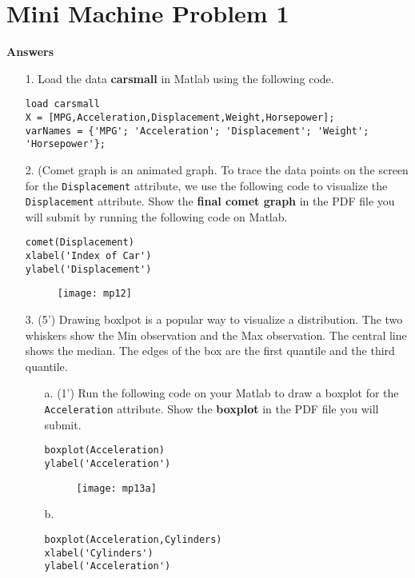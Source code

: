 \section*{Mini Machine Problem 1 }

\textbf{Answers} 


\begin{enumerate}
\item[1.] Load the data \textbf{carsmall} in Matlab using the following code.
\begin{lstlisting}
load carsmall
X = [MPG,Acceleration,Displacement,Weight,Horsepower];
varNames = {'MPG'; 'Acceleration'; 'Displacement'; 'Weight'; 'Horsepower'};
\end{lstlisting}
\item[2.] (Comet graph is an animated graph. To trace the data points on the screen for the \texttt{Displacement} attribute, we use the following code to visualize the \texttt{Displacement} attribute. Show the \textbf{final comet graph} in the PDF file you will submit by running the following code on Matlab.
\begin{lstlisting}
comet(Displacement)
xlabel('Index of Car')
ylabel('Displacement')
\end{lstlisting}

  \begin{figure}[h]
  \centering
\texttt{[image: mp12]}
  \end{figure}
  

\item[3.] (5') Drawing boxlpot is a popular way to visualize a distribution. The two whiskers show the Min observation and the Max observation. The central line shows the median. The edges of the box are the first quantile and the third quantile. 
\begin{itemize}
\item[a.] (1') Run the following code on your Matlab to draw a boxplot for the \texttt{Acceleration} attribute. Show the \textbf{boxplot}  in the PDF file you will submit.
\begin{lstlisting}
boxplot(Acceleration)
ylabel('Acceleration')
\end{lstlisting}
  \begin{figure}[h]
  \centering
\texttt{[image: mp13a]}
  \end{figure}
  

\item[b.] 

\begin{lstlisting}
boxplot(Acceleration,Cylinders)
xlabel('Cylinders')
ylabel('Acceleration')
\end{lstlisting}


\end{itemize}
\end{enumerate}
